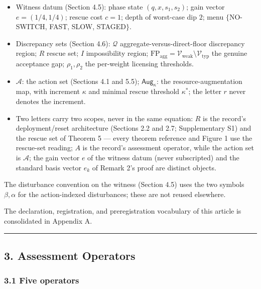 \documentclass[11pt]{article}
\begin{document}
\begin{itemize}
  \(\mathcal{V}_{\mathrm{weak}} = \bigcap_{w \in W_+} \mathcal{V}_w\),
  \(\mathcal{V}_{\mathrm{phys}} = \mathcal{V}[E_{\mathrm{tube,phys}}]\),
  \(\mathcal{V}_{\mathrm{end}} = \mathcal{V}[E_{\mathrm{end}}]\).
\item
  Witness datum (Section 4.5): phase state \((q, x, s_1, s_2)\); gain
  vector \(e = (1/4, 1/4)\); rescue cost \(c = 1\); depth of worst-case
  dip \(2\); menu \(\{\)NO-SWITCH, FAST, SLOW, STAGED\(\}\).
\item
  Discrepancy sets (Section 4.6): \(\mathcal{Q}\)
  aggregate-versus-direct-floor discrepancy region; \(R\) rescue set;
  \(I\) impossibility region;
  \(\mathrm{FP}_{\mathrm{agg}} = \mathcal{V}_{\mathrm{weak}} \setminus \mathcal{V}_{\mathrm{typ}}\)
  the genuine acceptance gap; \(\rho_1, \rho_2\) the per-weight
  licensing thresholds.
\item
  \(\mathcal{A}\): the action set (Sections 4.1 and 5.5);
  \(\mathsf{Aug}_\kappa\): the resource-augmentation map, with increment
  \(\kappa\) and minimal rescue threshold \(\kappa^*\); the letter \(r\)
  never denotes the increment.
\item
  Two letters carry two scopes, never in the same equation: \(R\) is the
  record's deployment/reset architecture (Sections 2.2 and 2.7;
  Supplementary S1) and the rescue set of Theorem 5 --- every theorem
  reference and Figure 1 use the rescue-set reading; \(A\) is the
  record's assessment operator, while the action set is \(\mathcal{A}\);
  the gain vector \(e\) of the witness datum (never subscripted) and the
  standard basis vector \(e_k\) of Remark 2's proof are distinct
  objects.
\end{itemize}

The disturbance convention on the witness (Section 4.5) uses the two
symbols \(\beta, \alpha\) for the action-indexed disturbances; these are
not reused elsewhere.

The declaration, registration, and preregistration vocabulary of this
article is consolidated in Appendix A.

\begin{center}\rule{0.5\linewidth}{0.5pt}\end{center}

\subsection{3. Assessment Operators}\label{assessment-operators}

\subsubsection{3.1 Five operators}\label{five-operators}
\end{document}
